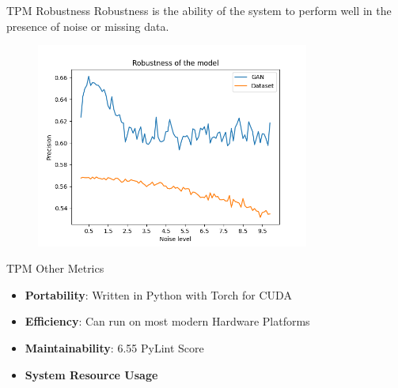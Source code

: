 \begin{frame}{TPM \textemdash{} Robustness}
    Robustness is the ability of the system to perform well in the presence of noise or missing data.

    \begin{figure}[!htbp]
        \centering
        \includegraphics[width=0.8\textwidth]{figures/Testing/robustness_plot}
    \end{figure}
\end{frame}
\begin{frame}{TPM \textemdash{} Other Metrics}
    \begin{itemize}
        \item \textbf{Portability}: Written in Python with Torch for CUDA
        \item \textbf{Efficiency}: Can run on most modern Hardware Platforms
        \item \textbf{Maintainability}: 6.55 PyLint Score
        \item \textbf{System Resource Usage}
    \end{itemize}
    \vspace*{-.5cm}
    \begin{table}[!htbp]
        \centering
    \end{table}
\end{frame}


